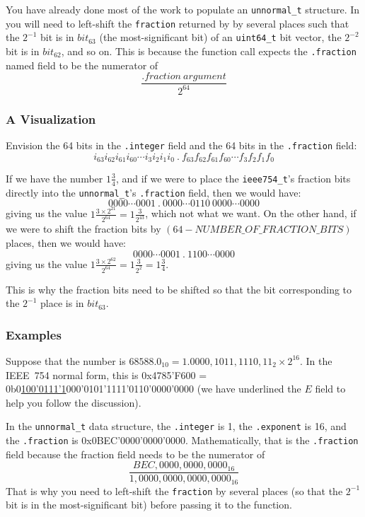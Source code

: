 You have already done most of the work to populate an \lstinline{unnormal_t} structure.
In  you will need to left-shift the \lstinline{fraction} returned by  by several places such that the $2^{-1}$ bit is in $bit_{63}$ (the most-significant bit) of an \lstinline{uint64_t} bit vector, the $2^{-2}$ bit is in $bit_{62}$, and so on.
This is because the  function call expects the \lstinline{.fraction} named field to be the numerator of
\[\frac{.fraction\ argument}{2^{64}}\]


\subsubsection{A Visualization}

Envision the 64 bits in the \lstinline{.integer} field and the 64 bits in the \lstinline{.fraction} field:
\[ i_{63} i_{62} i_{61} i_{60} \cdots i_3 i_2 i_1 i_0\ \mathbf{.} \ f_{63} f_{62} f_{61} f_{60} \cdots f_3 f_2 f_1 f_0 \]

If we have the number $1\frac{3}{4}$, and if we were to place the \lstinline{ieee754_t}'s fraction bits directly into the \lstinline{unnormal_t}'s \lstinline{.fraction} field, then we would have:
\[ 0000 \cdots 0001\ \mathbf{.} \ 0000 \cdots 0110\ 0000 \cdots 0000 \]
giving us the value $1\frac{3 \times 2^{21}}{2^{64}} = 1\frac{3}{2^{43}}$, which not what we want.
On the other hand, if we were to shift the fraction bits by $(64 - NUMBER\_OF\_FRACTION\_BITS)$ places, then we would have:
\[ 0000 \cdots 0001\ \mathbf{.} \ 1100 \cdots 0000 \]
giving us the value $1\frac{3 \times 2^{62}}{2^{64}} = 1\frac{3}{2^2} = 1\frac{3}{4}$.

This is why the fraction bits need to be shifted so that the bit corresponding to the $2^{-1}$ place is in $bit_{63}$.

\subsubsection{Examples}

Suppose that the number is $68588.0_{10} = 1.0000,1011,1110,11_{2} \times 2^{16}$.
In the IEEE~754 normal form, this is 0x4785'F600 = 0b0\underline{100'0111'1}000'0101'1111'0110'0000'0000 (we have underlined the $E$ field to help you follow the discussion).

In the \lstinline{unnormal_t} data structure, the \lstinline{.integer} is 1, the \lstinline{.exponent} is 16, and the \lstinline{.fraction} is 0x0BEC'0000'0000'0000.
Mathematically, that is the \lstinline{.fraction} field because the fraction field needs to be the numerator of
\[\frac{BEC,0000,0000,0000_{16}}{1,0000,0000,0000,0000_{16}}\]
That is why you need to left-shift the \lstinline{fraction} by several places (so that the $2^{-1}$ bit is in the most-significant bit) before passing it to the  function.

